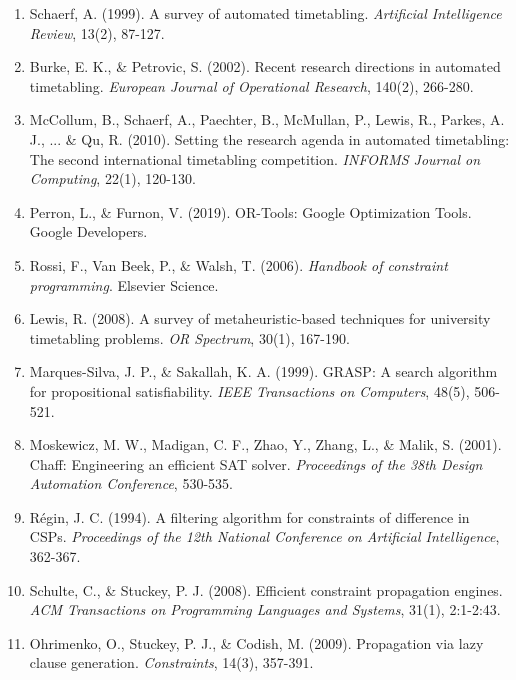 \documentclass[12pt,a4paper]{article}
\begin{document}
\begin{enumerate}
\item Schaerf, A. (1999). A survey of automated timetabling. \textit{Artificial Intelligence Review}, 13(2), 87-127.

\item Burke, E. K., \& Petrovic, S. (2002). Recent research directions in automated timetabling. \textit{European Journal of Operational Research}, 140(2), 266-280.

\item McCollum, B., Schaerf, A., Paechter, B., McMullan, P., Lewis, R., Parkes, A. J., ... \& Qu, R. (2010). Setting the research agenda in automated timetabling: The second international timetabling competition. \textit{INFORMS Journal on Computing}, 22(1), 120-130.

\item Perron, L., \& Furnon, V. (2019). OR-Tools: Google Optimization Tools. Google Developers.

\item Rossi, F., Van Beek, P., \& Walsh, T. (2006). \textit{Handbook of constraint programming}. Elsevier Science.

\item Lewis, R. (2008). A survey of metaheuristic-based techniques for university timetabling problems. \textit{OR Spectrum}, 30(1), 167-190.

\item Marques-Silva, J. P., \& Sakallah, K. A. (1999). GRASP: A search algorithm for propositional satisfiability. \textit{IEEE Transactions on Computers}, 48(5), 506-521.

\item Moskewicz, M. W., Madigan, C. F., Zhao, Y., Zhang, L., \& Malik, S. (2001). Chaff: Engineering an efficient SAT solver. \textit{Proceedings of the 38th Design Automation Conference}, 530-535.

\item Régin, J. C. (1994). A filtering algorithm for constraints of difference in CSPs. \textit{Proceedings of the 12th National Conference on Artificial Intelligence}, 362-367.

\item Schulte, C., \& Stuckey, P. J. (2008). Efficient constraint propagation engines. \textit{ACM Transactions on Programming Languages and Systems}, 31(1), 2:1-2:43.

\item Ohrimenko, O., Stuckey, P. J., \& Codish, M. (2009). Propagation via lazy clause generation. \textit{Constraints}, 14(3), 357-391.


\end{enumerate}
\end{document}
